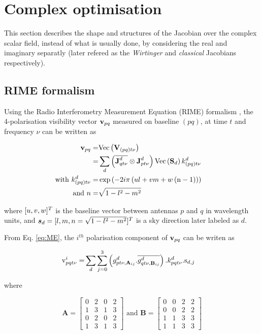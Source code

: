 \section{Complex optimisation}
\label{sec:Wirtinger}

This section describes the shape and structures of the
Jacobian over the complex scalar field, instead of what is usually done, by
considering the real and imaginary separatly (later refered as the
{\it Wirtinger} and {\it classical} Jacobians respectively). 


\subsection{RIME formalism}

Using the Radio Interferometry Measurement
Equation (RIME) formalism \citep[for
extensive discussions on the validity and limitations of the measurement
equation see][]{Hamaker96,Oleg11}, the 4-polarisation visibility
vector $\textbf{v}_{pq}$ measured on baseline
$(pq)$, at time $t$ and frequency $\nu$ can be written as


\begin{alignat}{2}
\label{eq:ME}
\textbf{v}_{pq}=&\text{Vec}\left(\textbf{V}_{(pq)t\nu}\right)&\\
=&\displaystyle\sum\limits_{d} \left(\overline{\textbf{J}^{d}_{qt\nu}}\otimes \textbf{J}^{d}_{pt\nu}\right)
\text{Vec}\left(\textbf{S}_d\right) k^{d}_{(pq)t\nu}\\
\text{with}\ k^{d}_{(pq)t\nu}=&\exp{\left(-2 i\pi
  \left(ul+vm+w\left(\text{n}-1\right)\right)\right)}\\
\text{and}\ n=&\sqrt{1-l^2-m^2}
\end{alignat}

\noindent where $[u,v,w]^T$ is the baseline vector between antennas
$p$ and $q$ in wavelength units, and
$\vec{s}_d=[\l,\m,\n=\sqrt{1-\l^2-\m^2}]^T$ is a sky direction later
labeled as $d$. 

From Eq. \ref{eq:ME}, the $i^{th}$ polarisation component of $\textbf{v}_{pq}$
can be writen as

\begin{alignat}{2}
\mathrm{v}^i_{pqt\nu}=&
\displaystyle\sum\limits_{d}
\displaystyle\sum\limits_{j=0}^3 \left(g^{d}_{pt\nu,\textbf{A}_{ij}}.\overline{g^{d}_{qt\nu,\textbf{B}_{ij}}}\right).k^{d}_{pqt\nu}.\text{s}_{d,j}
\end{alignat}

\noindent where 

\begin{equation}
\textbf{A}=
\begin{bmatrix}
0 & 2 & 0 & 2 \\ 
1 & 3 & 1 & 3 \\ 
0 & 2 & 0 & 2 \\
1 & 3 & 1 & 3 
\end{bmatrix}
\text{ and }
\textbf{B}=
\begin{bmatrix}
0 & 0 & 2 & 2 \\ 
0 & 0 & 2 & 2 \\ 
1 & 1 & 3 & 3 \\
1 & 1 & 3 & 3 
\end{bmatrix}
\end{equation}



